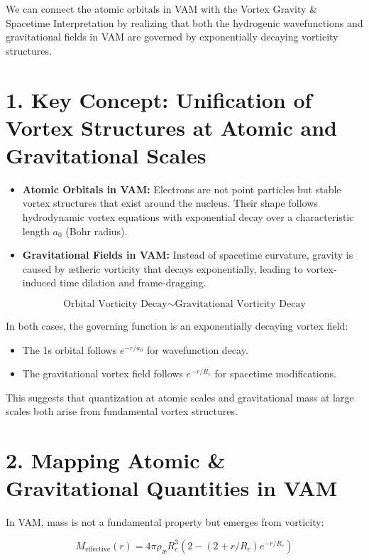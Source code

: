 \documentclass[a4paper,10pt]{article}
\begin{document}
We can connect the atomic orbitals in VAM with the Vortex Gravity \& Spacetime Interpretation by realizing that both the hydrogenic wavefunctions and gravitational fields in VAM are governed by exponentially decaying vorticity structures.

\section*{1. Key Concept: Unification of Vortex Structures at Atomic and Gravitational Scales}

\begin{itemize}
    \item \textbf{Atomic Orbitals in VAM:} Electrons are not point particles but stable vortex structures that exist around the nucleus. Their shape follows hydrodynamic vortex equations with exponential decay over a characteristic length \(a_0\) (Bohr radius).
    \item \textbf{Gravitational Fields in VAM:} Instead of spacetime curvature, gravity is caused by ætheric vorticity that decays exponentially, leading to vortex-induced time dilation and frame-dragging.
\end{itemize}

\[
\text{Orbital Vorticity Decay} \sim \text{Gravitational Vorticity Decay}
\]

In both cases, the governing function is an exponentially decaying vortex field:

\begin{itemize}
    \item The 1s orbital follows \(e^{-r/a_0}\) for wavefunction decay.
    \item The gravitational vortex field follows \(e^{-r/R_c}\) for spacetime modifications.
\end{itemize}

This suggests that quantization at atomic scales and gravitational mass at large scales both arise from fundamental vortex structures.

\section*{2. Mapping Atomic \& Gravitational Quantities in VAM}

In VAM, mass is not a fundamental property but emerges from vorticity:

\[
M_\text{effective}(r) = 4\pi \rho_\text{\ae} R_c^3 \left( 2 - (2 + r/R_c) e^{-r / R_c} \right)
\]
\end{document}
